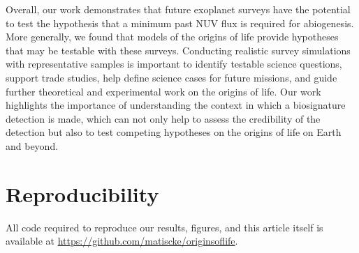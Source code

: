 \documentclass[twocolumn,twocolappendix,linenumbers]{aastex631}
\begin{document}
Overall, our work demonstrates that future exoplanet surveys have the potential to test the hypothesis that a minimum past \gls{NUV} flux is required for abiogenesis.
More generally, we found that models of the origins of life provide hypotheses that may be testable with these surveys.
Conducting realistic survey simulations with representative samples is important to identify testable science questions, support trade studies, help define science cases for future missions, and guide further theoretical and experimental work on the origins of life.
Our work highlights the importance of understanding the context in which a biosignature detection is made, which can not only help to assess the credibility of the detection but also to test competing hypotheses on the origins of life on Earth and beyond.



\section*{Reproducibility}
All code required to reproduce our results, figures, and this article itself is available at \url{https://github.com/matiscke/originsoflife}.


\end{document}
